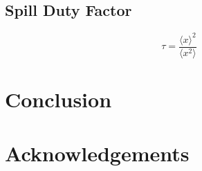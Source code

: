 \documentclass[11pt]{report}
\begin{document}

\section{Spill Duty Factor}


\begin{equation}
  \tau = \frac{\langle x\rangle^2}{\langle x^2\rangle}
\end{equation}

\chapter{Conclusion}


\chapter{Acknowledgements}

 
 
\end{document}
